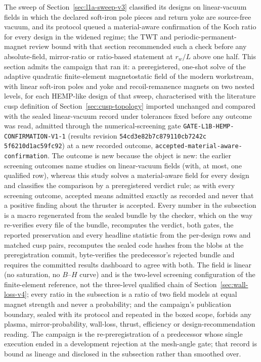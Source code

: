 \documentclass[11pt]{article}
\newcommand{\HempConfirmationEvidenceRevision}{\texttt{54cd3e82\allowbreak{}b7c87911\allowbreak{}0cb7242c\allowbreak{}%
5f6210d1\allowbreak{}ac59fc92}}
\begin{document}
The sweep of Section~\ref{sec:l1a-sweep-v3} classified its designs on linear-vacuum
fields in which the declared soft-iron pole pieces and return yoke are source-free
vacuum, and its protocol queued a material-aware confirmation of the Koch ratio for
every design in the widened regime; the TWT and periodic-permanent-magnet review
bound with that section recommended such a check before any absolute-field,
mirror-ratio or ratio-based statement at $r_w/L$ above one half. This section
admits the campaign that ran it: a preregistered, one-shot solve of the adaptive
quadratic finite-element magnetostatic field of the modern workstream, with linear
soft-iron poles and yoke and recoil-remanence magnets on two nested levels, for
each HEMP-like design of that sweep, characterised with the literature cusp
definition of Section~\ref{sec:cusp-topology} imported unchanged and compared with
the sealed linear-vacuum record under tolerances fixed before any outcome was read,
admitted through the numerical-screening gate
\texttt{GATE-L1B-HEMP-CONFIRMATION-V1-1} (results revision
\HempConfirmationEvidenceRevision) at a new recorded outcome,
\texttt{accepted-material-aware-confirmation}. The outcome is new because the
object is new: the earlier screening outcomes name studies on linear-vacuum fields
(with, at most, one qualified row), whereas this study solves a material-aware
field for every design and classifies the comparison by a preregistered verdict
rule; as with every screening outcome, accepted means admitted exactly as recorded
and never that a positive finding about the thruster is accepted. Every number in
the subsection is a macro regenerated from the sealed bundle by the checker, which
on the way re-verifies every file of the bundle, recomputes the verdict, both gates,
the reported preservation and every headline statistic from the per-design rows and
matched cusp pairs, recomputes the sealed code hashes from the blobs at the
preregistration commit, byte-verifies the predecessor's rejected bundle and
requires the committed results dashboard to agree with both. The field is linear
(no saturation, no $B$--$H$ curve) and is the two-level screening configuration of
the finite-element reference, not the three-level qualified chain of
Section~\ref{sec:wall-loss-v4}; every ratio in the subsection is a ratio of two
field models at equal magnet strength and never a probability; and the campaign's
publication boundary, sealed with its protocol and repeated in the boxed scope,
forbids any plasma, mirror-probability, wall-loss, thrust, efficiency or
design-recommendation reading. The campaign is the re-preregistration of a
predecessor whose single execution ended in a development rejection at the
mesh-angle gate; that record is bound as lineage and disclosed in the subsection
rather than smoothed over.
\end{document}
